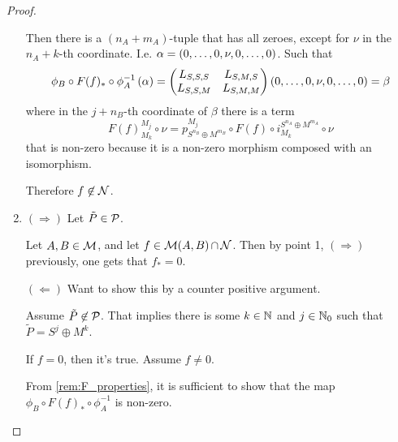 \begin{proof}
\begin{enumerate}
{\begin{enumerate}
{                    Then there is a \( (n_A + m_A) \)-tuple that has all zeroes, except for \( \nu \) in the \( n_A + k \)-th coordinate. I.e. \( \alpha = \left( 0, \dots, 0, \nu, 0, \dots, 0 \right) \). Such that
                    \[
                        \phi_B \circ F(f)_* \circ \phi_A^{-1} \left( \alpha \right)
                        =
                        \begin{pmatrix}
                            L_{S, S, S} & L_{S, M, S} \\
                            L_{S, S, M} & L_{S, M, M}
                        \end{pmatrix}
                        \left( 0, \dots, 0, \nu, 0, \dots, 0 \right)
                        = \beta
                    \]
                    where in the \( j + n_B \)-th coordinate of \( \beta \) there is a term
                    \[
                        F(f)_{M_k}^{M_j} \circ \nu = p_{S^{n_B} \oplus M^{m_B}}^{M_j} \circ F(f) \circ i_{M_k}^{S^{n_A} \oplus M^{m_A}} \circ \nu
                    \]
                    that is non-zero because it is a non-zero morphism composed with an isomorphism.

                    Therefore \( f \not\in {\mathcal{N}} \).
                }
            \end{enumerate} 
        }
        \item {
            \( (\Rightarrow) \) Let \( \tilde{P} \in {\mathcal{P}} \).



            Let \( A, B \in {\mathcal{M}} \), and let \( f \in {\mathcal{M}}(A, B) \mathop{\cap}\limits {\mathcal{N}} \). Then by point 1, \( (\Rightarrow) \) previously, one gets that \( f_* = 0 \).
            
            \( (\Leftarrow) \) Want to show this by a counter positive argument.

            Assume \( \tilde{P} \not\in {\mathcal{P}} \). That implies there is some \( k \in {\mathbb{N}} \) and \( j \in {\mathbb{N}}_0 \) such that \( \tilde{P} = S^j \oplus M^k \).

            If \( f = 0 \), then it's true. Assume \( f \neq 0 \).

            From \autoref{rem:F_properties}, it is sufficient to show that the map \( \phi_B \circ F(f)_* \circ \phi_A^{-1} \) is non-zero.


        }
    \end{enumerate}
\end{proof}